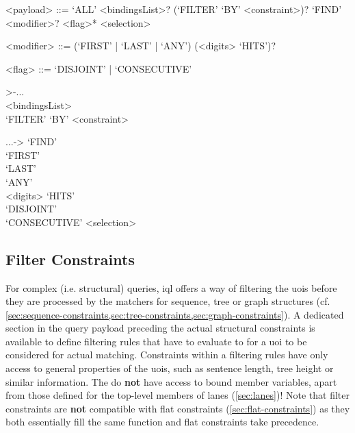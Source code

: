 \documentclass[11pt,a4paper]{report}
\begin{document}
\begin{gram}
	\label{gram:payload}
	\begin{grammar}	
		<payload> ::= `ALL' 
		\alt <bindingsList>? (`FILTER' `BY' <constraint>)? `FIND' <modifier>? <flag>* <selection>
		
		<modifier> ::= (`FIRST' | `LAST' | `ANY') (<digits> `HITS')?
		
		<flag> ::= `DISJOINT' | `CONSECUTIVE' 	
	\end{grammar}
	\diagsep
	\begin{samepage} %
	\begin{rrfrag}{>-}{...}
		\sst \\ <bindingsList> \est \sst \\ `FILTER' `BY' <constraint> \est 
	\end{rrfrag}
	\newline
	\begin{rrfrag}{...}{->}
		`FIND' \sst \\
			\sst `FIRST' \\ `LAST' \\ `ANY' \est
			\sst \\ <digits> `HITS' \est
		\est \sst \\ `DISJOINT' \\ `CONSECUTIVE' \est <selection>
	\end{rrfrag}
	\end{samepage}
\end{gram}

\subsection{Filter Constraints}
\label{sec:filter-constraints}
\noindent For complex (i.e. structural) queries, \ac{iql} offers a way of filtering the \acp{uoi} before they are processed by the matchers for sequence, tree or graph structures (cf. \cref{sec:sequence-constraints,sec:tree-constraints,sec:graph-constraints}).
A dedicated  section in the query payload preceding the actual structural constraints is available to define filtering rules that have to evaluate to  for a \ac{uoi} to be considered for actual matching.
Constraints within a filtering rules have only access to general properties of the \acp{uoi}, such as sentence length, tree height or similar information.
The do \textbf{not} have access to bound member variables, apart from those defined for the top-level members of lanes (\ref{sec:lanes})!
Note that filter constraints are \textbf{not} compatible with flat constraints (\ref{sec:flat-constraints}) as they both essentially fill the same function and flat constraints take precedence.
\end{document}
